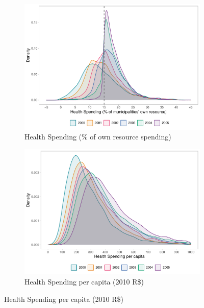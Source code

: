 \begin{figure}[h!]
    \begin{center}
    \caption{\footnotesize Spending Density Plots}\label{fig:density}
    \begin{subfigure}{0.48\textwidth}
        \caption{\scriptsize Health Spending (\% of own resource spending)}\label{fig:density_a}
        \centering
        \includegraphics[width=\textwidth]{plots/hist_ec29.pdf}
    \end{subfigure}
        \begin{subfigure}{0.48\textwidth}
        \caption{\scriptsize Health Spending per capita (2010 R\$)}\label{fig:density_b}
        \centering
        \includegraphics[width=\textwidth]{plots/hist_pc.pdf}
    \end{subfigure}
    \end{center}\vspace{+1pt}
\end{figure}